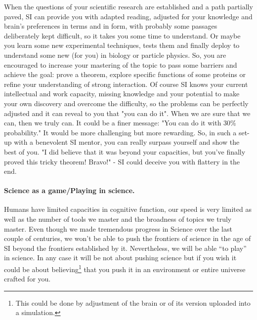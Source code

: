 \documentclass[a4paper,11pt]{article}
\begin{document}
When the questions of your scientific research are established and a path partially paved, SI can provide you with adapted reading, adjusted for your knowledge and brain's preferences in terms and in form, with probably some passages deliberately kept difficult, so it takes you some time to understand.
Or maybe you learn some new experimental techniques, tests them and finally deploy to understand some new (for you) in biology or particle physics.
So, you are encouraged to increase your mastering of the topic to pass some barriers and achieve the goal: prove a theorem, explore specific functions of some proteins or refine your understanding of strong interaction. Of course SI knows your current intellectual and work capacity, missing knowledge and your potential to make your own discovery and overcome the difficulty, so the problems can be perfectly adjusted and it can reveal to you that "you can do it". When we are sure that we can, then we truly can. It could be a finer message: "You can do it with 30\% probability." It would be more challenging but more rewarding. So, in such a set-up with a benevolent SI mentor, you can really surpass yourself and show the best of you. "I did believe that it was beyond your capacities, but you've finally proved this tricky theorem! Bravo!" - SI could deceive you with flattery in the end.

\paragraph{Science as a game/Playing in science.}
Humans have limited capacities in cognitive function, our speed is very limited as well as the number of tools we master and the broadness of topics we truly master. Even though we made tremendous progress in Science over the last couple of centuries, we won't be able to push the frontiers of science in the age of SI beyond the frontiers established by it. Nevertheless, we will be able ``to play'' in science. In any case it will be not about pushing science but if you wish it could be about believing\footnote{This could be done by adjustment of the brain or of its version uploaded into a simulation.} that you push it in an environment or entire universe crafted for you.
\end{document}
